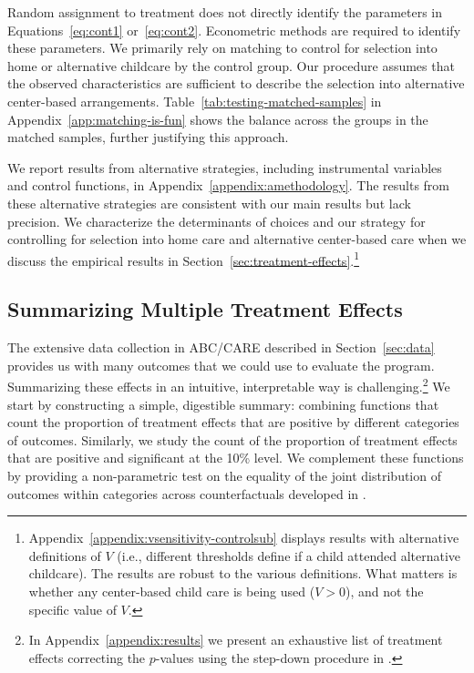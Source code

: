 Random assignment to treatment does not directly identify the parameters in Equations~\eqref{eq:cont1} or~\eqref{eq:cont2}. Econometric methods are required to identify these parameters. We primarily rely on matching to control for selection into home or alternative childcare by the control group. Our procedure assumes that the observed characteristics are sufficient to describe the selection into alternative center-based arrangements. Table~\ref{tab:testing-matched-samples} in Appendix~\ref{app:matching-is-fun} shows the balance across the groups in the matched samples, further justifying this approach.

We report results from alternative strategies, including instrumental variables and control functions, in Appendix~\ref{appendix:amethodology}. The results from these alternative strategies are consistent with our main results but lack precision. We characterize the determinants of choices and our strategy for controlling for selection into home care and alternative center-based care when we discuss the empirical results in Section~\ref{sec:treatment-effects}.\footnote{Appendix~\ref{appendix:vsensitivity-controlsub} displays results with alternative definitions of $V$ (i.e., different thresholds define if a child attended alternative childcare). The results are robust to the various definitions. What matters is whether any center-based child care is being used ($V>0$), and not the specific value of $V$.}

\subsection{Summarizing Multiple Treatment Effects}\label{sec:combining-functions}

The extensive data collection in ABC/CARE described in Section~\ref{sec:data} provides us with many outcomes that we could use to evaluate the program. Summarizing these effects in an intuitive, interpretable way is challenging.\footnote{In Appendix~\ref{appendix:results} we present an exhaustive list of treatment effects correcting the $p$-values using the step-down procedure in \citet{Romano_Wolf_2016_pval_SaPL}.} We start by constructing a simple, digestible summary: combining functions that count the proportion of treatment effects that are positive by different categories of outcomes. Similarly, we study the count of the proportion of treatment effects that are positive and significant at the 10\% level. We complement these functions by providing a non-parametric test on the equality of the joint distribution of outcomes within categories across counterfactuals developed in \citep{Rosenbaum_2005_Distribution_JRSS}.

